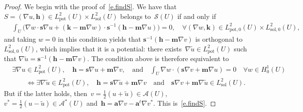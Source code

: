 \documentclass[11pt]{article} %
\numberwithin{equation}{section}
\theoremstyle{definition}
\renewcommand*{\tilde}{\widetilde}
\newcommand{\s}{\mathbf{s}}
\renewcommand{\a}{\mathbf{a}}
\newcommand{\m}{\mathbf{m}}
\renewcommand{\S}{\mathcal{S}}
\newcommand{\A}{\mathcal{A}}
\newcommand{\Lsol}{L^2_{\mathrm{sol}}}
\newcommand{\Lsolo}{L^2_{\mathrm{sol,0}}}
\newcommand{\Lpot}{L^2_{\mathrm{pot}}}
\newcommand{\Lpoto}{L^2_{\mathrm{pot,0}}}
\begin{document}
\begin{proof}
We begin with the proof of~\eqref{e.findS}. %
We have that~$S=(\nabla u,\mathbf{h}) \in \Lpot(U)\times\Lsol(U)$ belongs to~$\S(U)$ if and only if 
\begin{align*}
& 
\int_U \bigl(
\nabla w \cdot \s \nabla u + (\mathbf{k}-\m\nabla w) \cdot \s^{-1} (\mathbf{h} - \m\nabla u )
\bigr) = 0, \quad \forall (\nabla w,\mathbf{k}) \in \Lpoto(U) \times \Lsolo(U),
\end{align*}
and taking $w=0$ in this condition yields that $\s^{-1}(\mathbf{h}-\m\nabla v)$ is orthogonal to~$\Lsolo(U)$, which implies that it is a potential: there exists~$\nabla \tilde u\in \Lpot(U)$ such that $\nabla \tilde u = \s^{-1}(\mathbf{h}-\m\nabla v)$. The condition above is therefore equivalent to 
\begin{align*}
& 
\exists \nabla u \in \Lpot(U), \quad 
\mathbf{h} = \s \nabla u+\m \nabla v, 
\quad \mbox{and} \quad 
\int_U \nabla w \cdot (\s\nabla v + \m \nabla u) = 0  \quad \forall w \in H^1_0(U)
\\ & \qquad 
\iff
\exists \nabla \tilde u \in \Lpot(U), \quad 
\mathbf{h} = \s \nabla \tilde u+\m \nabla v 
\quad \mbox{and}\quad
\s\nabla v + \m\nabla \tilde u \in \Lsol(U). 
\end{align*}
But if the latter holds, then~$v = \frac12(u + \tilde u)\in\A(U)$,~$v^* = \frac12(u-\tilde u)\in\A^*(U)$ and~$\mathbf{h} = \a\nabla v - \a^t \nabla v^*$. This is~\eqref{e.findS}. 

\smallskip


\end{proof}
\end{document}
